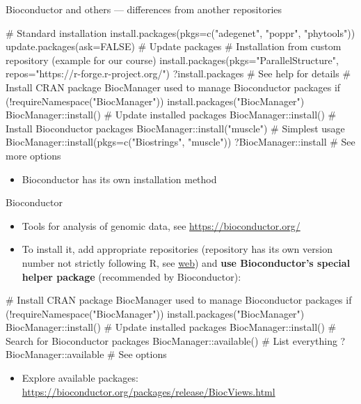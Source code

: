 \documentclass[compress, ucs, xelatex, 11pt, xcolor=svgnames,
	hyperref={
		bookmarks=true,
		unicode=true,
		colorlinks=true,
		pdftitle={Molecular data in R},
		plainpages=false,
		pdfauthor={Vojtech Zeisek},
		pdfsubject={Course about phylogeny and evolution in R},
		pdfcreator={XeLaTeX},
		pdfkeywords={R, evolution, phylogeny, molecular data},
		linkcolor=Tomato,
		anchorcolor=SaddleBrown,
		citecolor=Goldenrod,
		filecolor=DarkMagenta,
		menucolor=Sienna,
		urlcolor=DarkTurquoise,
		pdftex},
	url={hyphens, lowtilde} %
	]{beamer}
\begin{document}
\begin{frame}[fragile]{Bioconductor and others --- differences from another repositories}
	\label{sources-diff}
	\begin{spluscode}
    # Standard installation
    install.packages(pkgs=c("adegenet", "poppr", "phytools"))
    update.packages(ask=FALSE) # Update packages
    # Installation from custom repository (example for our course)
    install.packages(pkgs="ParallelStructure",
      repos="https://r-forge.r-project.org/")
    ?install.packages # See help for details
    # Install CRAN package BiocManager used to manage Bioconductor packages
    if (!requireNamespace("BiocManager"))
      install.packages("BiocManager")
    BiocManager::install() # Update installed packages
    BiocManager::install()
    # Install Bioconductor packages
    BiocManager::install("muscle") # Simplest usage
    BiocManager::install(pkgs=c("Biostrings", "muscle"))
    ?BiocManager::install # See more options
	\end{spluscode}
	\begin{itemize}
		\item Bioconductor has its own installation method
	\end{itemize}
\end{frame}

\begin{frame}[fragile]{Bioconductor}
	\label{bioc}
	\begin{itemize}
		\item Tools for analysis of genomic data, see \url{https://bioconductor.org/}
		\item To install it, add appropriate repositories (repository has its own version number not strictly following R, see \href{https://bioconductor.org/install}{web}) and \textbf{use Bioconductor's special helper package} (recommended by Bioconductor):
	\end{itemize}
	\begin{spluscode}
    # Install CRAN package BiocManager used to manage Bioconductor packages
    if (!requireNamespace("BiocManager"))
      install.packages("BiocManager")
    BiocManager::install()
    # Update installed packages
    BiocManager::install()
    # Search for Bioconductor packages
    BiocManager::available() # List everything
    ?BiocManager::available # See options
	\end{spluscode}
	\begin{itemize}
		\item Explore available packages: \url{https://bioconductor.org/packages/release/BiocViews.html}
	\end{itemize}
\end{frame}
\end{document}
